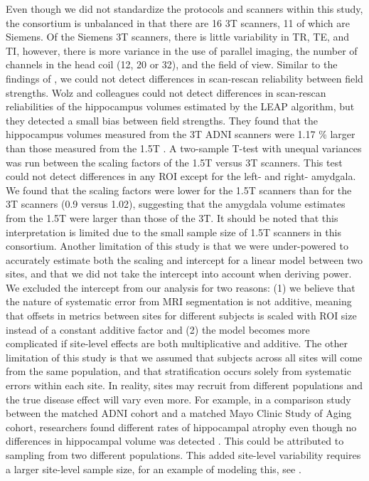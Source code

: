 \documentclass{article}
\begin{document}
Even though we did not standardize the protocols and scanners within this study, the consortium is unbalanced in that there are 16 3T scanners, 11 of which are Siemens. Of the Siemens 3T scanners, there is little variability in TR, TE, and TI, however, there is more variance in the use of parallel imaging, the number of channels in the head coil (12, 20 or 32), and the field of view. Similar to the findings of \cite{Jovicich_2009}, we could not detect differences in scan-rescan reliability between field strengths. Wolz and colleagues could not detect differences in scan-rescan reliabilities of the hippocampus volumes estimated by the LEAP algorithm, but they detected a small bias between field strengths. They found that the hippocampus volumes measured from the 3T ADNI scanners were 1.17 \% larger than those measured from the 1.5T \cite{Wolz_2014}. A two-sample T-test with unequal variances was run between the scaling factors of the 1.5T versus 3T scanners. This test could not detect differences in any ROI except for the left- and right- amydgala. We found that the scaling factors were lower for the 1.5T scanners than for the 3T scanners (0.9 versus 1.02), suggesting that the amygdala volume estimates from the 1.5T were larger than those of the 3T. It should be noted that this interpretation is limited due to the small sample size of 1.5T scanners in this consortium.  
Another limitation of this study is that we were under-powered to accurately estimate both the scaling and intercept for a linear model between two sites, and that we did not take the intercept into account when deriving power. We excluded the intercept from our analysis for two reasons: (1) we believe that the nature of systematic error from MRI segmentation is not additive, meaning that offsets in metrics between sites for different subjects is scaled with ROI size instead of a constant additive factor and (2) the model becomes more complicated if site-level effects are both multiplicative and additive. The other limitation of this study is that we assumed that subjects across all sites will come from the same population, and that stratification occurs solely from systematic errors within each site. In reality, sites may recruit from different populations and the true disease effect will vary even more. For example, in a comparison study between the matched ADNI cohort and a matched Mayo Clinic Study of Aging cohort, researchers found different rates of hippocampal atrophy even though no differences in hippocampal volume was detected \cite{Whitwell_2012}. This could be attributed to sampling from two different populations. This added site-level variability requires a larger site-level sample size, for an example of modeling this, see \cite{enigmarandom}. 
\end{document}
